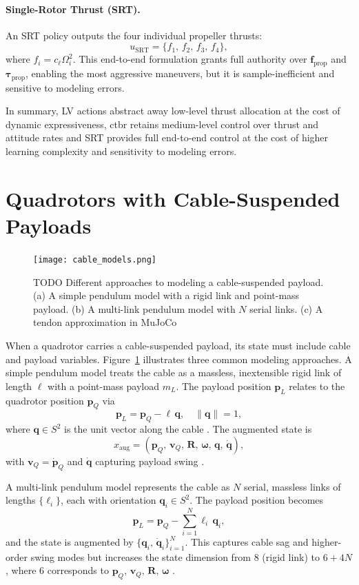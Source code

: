 \paragraph{Single-Rotor Thrust (SRT).}  
An SRT policy outputs the four individual propeller thrusts:
\[
u_{\mathrm{SRT}} = \{f_1,\,f_2,\,f_3,\,f_4\},
\]
where \(f_i = c_\ell \Omega_i^2\). This end-to-end formulation grants full authority over \(\mathbf{f}_{\mathrm{prop}}\) and \(\boldsymbol{\tau}_{\mathrm{prop}}\), enabling the most aggressive maneuvers, but it is sample-inefficient and sensitive to modeling errors.

In summary, LV actions abstract away low-level thrust allocation at the cost of dynamic expressiveness, \gls{ctbr} retains medium-level control over thrust and attitude rates and SRT provides full end-to-end control at the cost of higher learning complexity and sensitivity to modeling errors.
\section{Quadrotors with Cable-Suspended Payloads}
\label{sec:quadrotor_with_payloads}
\begin{figure}

  \centering
  \texttt{[image: cable\_models.png]}
  \caption[Cable modeling approaches]{TODO Different approaches to modeling a cable-suspended payload. (a) A simple pendulum model with a rigid link and point-mass payload. (b) A multi-link pendulum model with \(N\) serial links. (c) A tendon approximation in MuJoCo}
  \label{fig:cable_models}
\end{figure}
When a quadrotor carries a cable-suspended payload, its state must include cable and payload variables. Figure~\ref{fig:cable_models} illustrates three common modeling approaches. A simple pendulum model treats the cable as a massless, inextensible rigid link of length \(\ell\) with a point-mass payload \(m_L\). The payload position \(\mathbf{p}_L\) relates to the quadrotor position \(\mathbf{p}_Q\) via
\[
\mathbf{p}_L = \mathbf{p}_Q - \ell\,\mathbf{q}, 
\quad
\|\mathbf{q}\| = 1,
\]
where \(\mathbf{q}\in S^2\) is the unit vector along the cable \cite{estevez_review_2024}. The augmented state is
\[
x_{\mathrm{aug}} = (\mathbf{p}_Q,\,\mathbf{v}_Q,\,\mathbf{R},\,\boldsymbol{\omega},\,\mathbf{q},\,\dot{\mathbf{q}}),
\]
with \(\mathbf{v}_Q = \dot{\mathbf{p}}_Q\) and \(\dot{\mathbf{q}}\) capturing payload swing \cite{Wahba2024}.

A multi-link pendulum model represents the cable as \(N\) serial, massless links of lengths \(\{\ell_i\}\), each with orientation \(\mathbf{q}_i\in S^2\). The payload position becomes
\[
\mathbf{p}_L = \mathbf{p}_Q - \sum_{i=1}^N \ell_i\,\mathbf{q}_i,
\]
and the state is augmented by \(\{\mathbf{q}_i,\,\dot{\mathbf{q}}_i\}_{i=1}^N\). This captures cable sag and higher-order swing modes but increases the state dimension from 8 (rigid link) to \(6+4N\), where 6 corresponds to \(\mathbf{p}_Q,\,\mathbf{v}_Q,\,\mathbf{R},\,\boldsymbol{\omega}\) \cite{goodarzi_dynamics_2015}.

